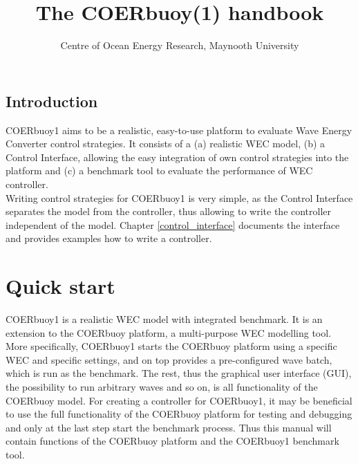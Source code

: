 \documentclass[oneside,10pt,a4paper]{book}
\title{The COERbuoy(1) handbook}
\author{Centre of Ocean Energy Research, Maynooth University}
\begin{document}
\maketitle
\section*{Introduction}
COERbuoy1 aims to be a realistic, easy-to-use platform to evaluate Wave Energy Converter control strategies. It consists of a (a) realistic WEC model, (b) a Control Interface, allowing the easy integration of own control strategies into the platform and (c) a benchmark tool to evaluate the performance of WEC controller.\\
Writing control strategies for COERbuoy1 is very simple, as the Control Interface separates the model from the controller, thus allowing to write the controller independent of the model. Chapter \ref{control_interface} documents the interface and provides examples how to write a controller.%
\tableofcontents
\newpage
\chapter{Quick start}
COERbuoy1 is a realistic WEC model with integrated benchmark. It is an extension to the COERbuoy platform, a multi-purpose WEC modelling tool. More specifically, COERbuoy1 starts the COERbuoy platform using a specific WEC and specific settings, and on top provides a pre-configured wave batch, which is run as the benchmark. The rest, thus the graphical user interface (GUI), the possibility to run arbitrary waves and so on, is all functionality of the COERbuoy model. For creating a controller for COERbuoy1, it may be beneficial to use the full functionality of the COERbuoy platform for testing and debugging and only at the last step start the benchmark process. Thus this manual will contain functions of the COERbuoy platform and the COERbuoy1 benchmark tool.
\end{document}
